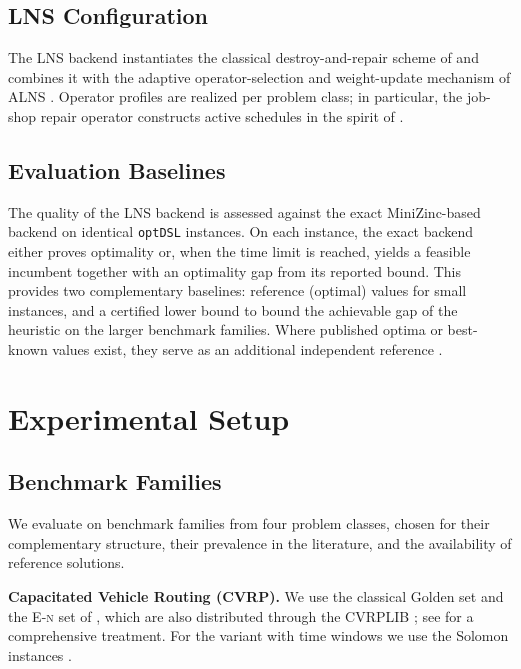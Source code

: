 \documentclass[11pt,a4paper]{article}
\begin{document}
\subsection{LNS Configuration}
The LNS backend instantiates the classical destroy-and-repair scheme of \citet{shaw1998lns} and combines it with the adaptive operator-selection and weight-update mechanism of ALNS \citep{ropke2006alns,pisinger2010lns,pisinger2019lns}.
Operator profiles are realized per problem class; in particular, the job-shop repair operator constructs active schedules in the spirit of \citet{applegate1991}.

\subsection{Evaluation Baselines}
The quality of the LNS backend is assessed against the exact MiniZinc-based
backend on identical \texttt{optDSL} instances.
On each instance, the exact backend either proves optimality or, when the
time limit is reached, yields a feasible incumbent together with an
optimality gap from its reported bound.
This provides two complementary baselines: reference (optimal) values for
small instances, and a certified lower bound to bound the achievable gap of
the heuristic on the larger benchmark families.
Where published optima or best-known values exist, they serve as an
additional independent reference
\citep{applegate1991,nowicki1996fast,taillard1993benchmarks,uchoa2017cvrplib,martello1998exact}.

\section{Experimental Setup}
\subsection{Benchmark Families}
We evaluate on benchmark families from four problem classes, chosen for their complementary structure, their prevalence in the literature, and the availability of reference solutions.

\textbf{Capacitated Vehicle Routing (CVRP).}
We use the classical Golden set \citep{christofides1979,golden1998} and the \textsc{E-n} set of \citet{christofides1969}, which are also distributed through the CVRPLIB \citep{uchoa2017cvrplib}; see \citet{toth2014vrp} for a comprehensive treatment.
For the variant with time windows we use the Solomon instances \citep{solomon1987vrptw}.
\end{document}
